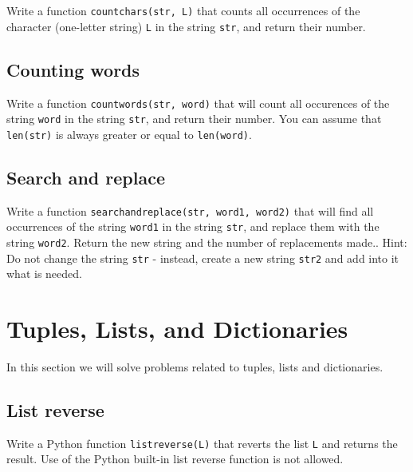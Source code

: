 Write a function {\tt countchars(str, L)} that counts 
all occurrences of the character (one-letter string) {\tt L} in the string {\tt str}, 
and return their number. 


\subsection{Counting words}

Write a function {\tt countwords(str, word)} that will count 
all occurences of the string {\tt word} in the string {\tt str}, and 
return their number. You can assume that {\tt len(str)} is always greater 
or equal to {\tt len(word)}.


\subsection{Search and replace}

Write a function {\tt searchandreplace(str, word1, word2)} that will 
find all occurrences of the string {\tt word1} in the string {\tt str}, and 
replace them with the string {\tt word2}. Return the new string and the number
of replacements made..
Hint: Do not change the string {\tt str} - instead, 
create a new string {\tt str2} and add into it what is needed.


\section{Tuples, Lists, and Dictionaries}

In this section we will solve problems related to tuples, lists and dictionaries. 


\subsection{List reverse}

Write a Python function {\tt listreverse(L)} that reverts the list {\tt L} and 
returns the result. Use of the Python built-in list reverse function is not allowed. 

